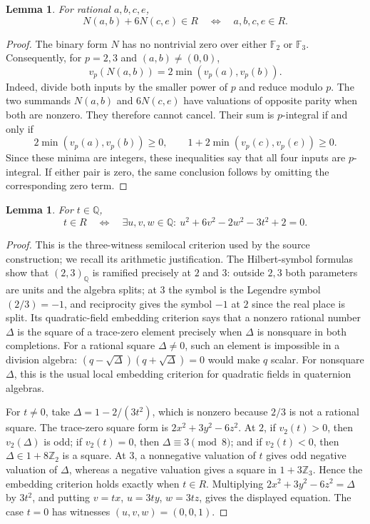\documentclass[11pt,a4paper]{article}
\newtheorem{lemma}[theorem]{Lemma}
\theoremstyle{definition}
\theoremstyle{remark}
\begin{document}
\begin{lemma}\label{lem:four-semilocal-inputs}
For rational $a,b,c,e$,
\[
 N(a,b)+6N(c,e)\in R
 \quad\Longleftrightarrow\quad a,b,c,e\in R.
\]
\end{lemma}
\begin{proof}
The binary form $N$ has no nontrivial zero over either $\mathbb F_2$
or $\mathbb F_3$. Consequently, for $p=2,3$ and $(a,b)\ne(0,0)$,
\[
                    v_p(N(a,b))=2\min(v_p(a),v_p(b)).
\]
Indeed, divide both inputs by the smaller power of $p$ and reduce
modulo $p$. The two summands $N(a,b)$ and $6N(c,e)$ have valuations
of opposite parity when both are nonzero. They therefore cannot
cancel. Their sum is $p$-integral if and only if
\[
 2\min(v_p(a),v_p(b))\ge0,
 \qquad 1+2\min(v_p(c),v_p(e))\ge0.
\]
Since these minima are integers, these inequalities say that all four
inputs are $p$-integral. If either pair is zero, the same conclusion
follows by omitting the corresponding zero term.
\end{proof}

\begin{lemma}\label{lem:semilocal-three-witnesses}
For $t\in\mathbb Q$,
\[
 t\in R\quad\Longleftrightarrow\quad
 \exists u,v,w\in\mathbb Q:\
                u^2+6v^2-2w^2-3t^2+2=0.
\]
\end{lemma}
\begin{proof}
This is the three-witness semilocal criterion used by the source
construction; we recall its arithmetic justification.
The Hilbert-symbol formulas show that $(2,3)_{\mathbb Q}$ is
ramified precisely at $2$ and $3$: outside $2,3$ both parameters
are units and the algebra splits; at $3$ the symbol is the
Legendre symbol $(2/3)=-1$, and reciprocity gives the symbol
$-1$ at $2$ since the real place is split. Its quadratic-field
embedding criterion \cite[Proposition 14.6.7]{Voight2021} says that a
nonzero rational number $\Delta$ is the square of a trace-zero
element precisely when $\Delta$ is nonsquare in both completions.
For a rational square $\Delta\ne0$, such an element is impossible
in a division algebra: $(q-\sqrt\Delta)(q+\sqrt\Delta)=0$ would
make $q$ scalar. For nonsquare $\Delta$, this is the usual local
embedding criterion for quadratic fields in quaternion algebras.

For $t\ne0$, take $\Delta=1-2/(3t^2)$, which is nonzero because
$2/3$ is not a rational square. The trace-zero square form is
$2x^2+3y^2-6z^2$. At $2$, if $v_2(t)>0$, then $v_2(\Delta)$ is
odd; if $v_2(t)=0$, then $\Delta\equiv3\pmod8$; and if
$v_2(t)<0$, then $\Delta\in1+8\mathbb Z_2$ is a square.
At $3$, a nonnegative valuation of $t$ gives odd negative valuation
of $\Delta$, whereas a negative valuation gives a square in
$1+3\mathbb Z_3$. Hence the embedding criterion holds exactly
when $t\in R$. Multiplying
$2x^2+3y^2-6z^2=\Delta$ by $3t^2$, and putting
$v=tx$, $u=3ty$, $w=3tz$, gives the displayed equation.
The case $t=0$ has witnesses $(u,v,w)=(0,0,1)$.
\end{proof}
\end{document}
